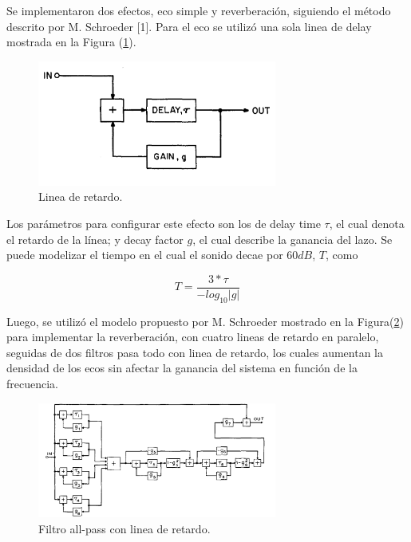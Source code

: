 



Se implementaron dos efectos, eco simple y reverberación, siguiendo el método descrito por M. Schroeder [1]. Para el eco se utilizó una sola linea de delay mostrada en la Figura (\ref{delay}).

\begin{figure}[H]
	\centering
	\includegraphics[width=0.7\textwidth]{ImagenesEjercicio6/delay.png}
	\caption{Linea de retardo.}
	\label{delay}
\end{figure}

Los parámetros para configurar este efecto son los de delay time $\tau$, el cual denota el retardo de la línea; y decay factor $g$, el cual describe la ganancia del lazo. Se puede modelizar el tiempo en el cual el sonido decae por $60dB$, $T$, como

\begin{equation}
T = \frac{3*\tau }{-log_{10} | g | }
\label{delayeq}
\end{equation}

Luego, se utilizó el modelo propuesto por M. Schroeder mostrado en la Figura(\ref{rev}) para implementar la reverberación, con cuatro lineas de retardo en paralelo, seguidas de dos filtros pasa todo con linea de retardo, los cuales aumentan la densidad de los ecos sin afectar la ganancia del sistema en función de la frecuencia.

\begin{figure}[H]
	\centering
	\includegraphics[width=0.7\textwidth]{ImagenesEjercicio6/rev.png}
	\caption{Filtro all-pass con linea de retardo.}
	\label{rev}
\end{figure}


